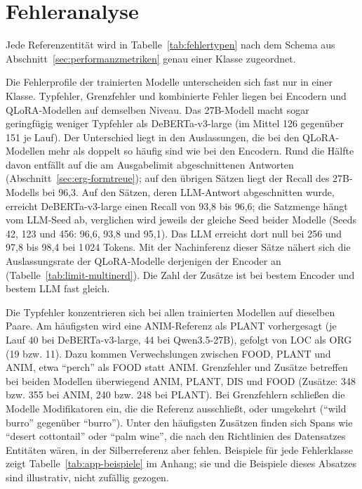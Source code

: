 \section{Fehleranalyse}
\label{sec:erg-fehlertypen}

Jede Referenzentität wird in Tabelle~\ref{tab:fehlertypen} nach dem
Schema aus Abschnitt~\ref{sec:performanzmetriken} genau einer Klasse
zugeordnet.

\begin{table}[htbp]
  \centering
  \footnotesize
  \caption[Fehlerprofile auf dem Testsplit]{Fehlerprofile auf dem Testsplit: Verteilung der 25\,645
  Referenzentitäten auf Fehlerklassen (in Prozent) sowie Zahl der
  Zusätze (vorhergesagte Spans ohne Überlappung mit einer Referenz).
  Trainierte Konfigurationen als Mittel über drei Seeds.}
  \label{tab:fehlertypen}
  \setlength{\tabcolsep}{3pt}
  
\end{table}

Die Fehlerprofile der trainierten Modelle unterscheiden sich fast nur in
einer Klasse.
Typfehler, Grenzfehler und kombinierte Fehler liegen bei Encodern und
QLoRA-Modellen auf demselben Niveau. Das 27B-Modell macht sogar
geringfügig weniger Typfehler als DeBERTa-v3-large (im Mittel 126
gegenüber 151 je Lauf).
Der Unterschied liegt in den Auslassungen, die bei den QLoRA-Modellen
mehr als doppelt so häufig sind wie bei den Encodern. Rund die Hälfte
davon entfällt auf die am Ausgabelimit abgeschnittenen Antworten
(Abschnitt~\ref{sec:erg-formtreue}); auf den übrigen Sätzen liegt der
Recall des 27B-Modells bei 96,3.
Auf den Sätzen, deren LLM-Antwort abgeschnitten wurde, erreicht
DeBERTa-v3-large einen Recall von 93,8 bis 96,6; die Satzmenge hängt vom
LLM-Seed ab, verglichen wird jeweils der gleiche Seed beider Modelle
(Seeds 42, 123 und 456: 96,6, 93,8 und 95,1).
Das LLM erreicht dort null bei 256 und 97,8 bis 98,4 bei 1\,024 Tokens.
Mit der Nachinferenz dieser Sätze nähert sich die Auslassungsrate der
QLoRA-Modelle derjenigen der Encoder an (Tabelle~\ref{tab:limit-multinerd}).
Die Zahl der Zusätze ist bei bestem Encoder und bestem LLM fast gleich.

Die Typfehler konzentrieren sich bei allen trainierten Modellen auf
dieselben Paare.
Am häufigsten wird eine ANIM-Referenz als PLANT vorhergesagt (je Lauf 40
bei DeBERTa-v3-large, 44 bei Qwen3.5-27B), gefolgt von LOC als ORG (19
bzw. 11). Dazu kommen Verwechslungen zwischen FOOD, PLANT und ANIM, etwa
\enquote{perch} als FOOD statt ANIM.
Grenzfehler und Zusätze betreffen bei beiden Modellen überwiegend ANIM,
PLANT, DIS und FOOD (Zusätze: 348 bzw. 355 bei ANIM, 240 bzw. 248 bei
PLANT).
Bei Grenzfehlern schließen die Modelle Modifikatoren ein, die die
Referenz ausschließt, oder umgekehrt (\enquote{wild burro} gegenüber
\enquote{burro}). Unter den häufigsten Zusätzen finden sich Spans wie
\enquote{desert cottontail} oder \enquote{palm wine}, die nach den
Richtlinien des Datensatzes Entitäten wären, in der Silberreferenz aber
fehlen.
Beispiele für jede Fehlerklasse zeigt Tabelle~\ref{tab:app-beispiele}
im Anhang; sie und die Beispiele dieses Absatzes sind illustrativ, nicht
zufällig gezogen.

